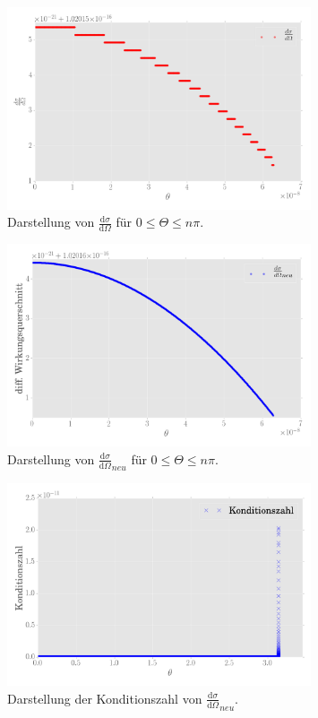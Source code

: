 \begin{figure}
\centering
\includegraphics[width=0.8\textwidth]{plot4_c1.png}
\caption{Darstellung von $\frac{\mathup{d}\sigma}{\mathup{d}\Omega}$ für $0\leq\Theta\leq n\pi$.}
\label{1}
\end{figure}

\begin{figure}
\centering
\includegraphics[width=0.8\textwidth]{plot4_c2.png}
\caption{Darstellung von $\frac{\mathup{d}\sigma}{\mathup{d}\Omega}_{neu}$ für $0\leq\Theta\leq n\pi$.}
\label{2}
\end{figure}

\begin{figure}
\centering
\includegraphics[width=0.8\textwidth]{plot4_e.png}
\caption{Darstellung der Konditionszahl von  $\frac{\mathup{d}\sigma}{\mathup{d}\Omega}_{neu}$.}
\label{3}
\end{figure}

